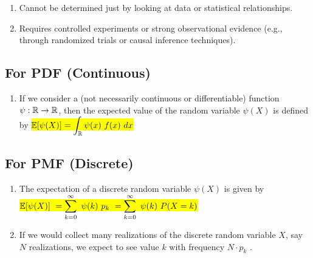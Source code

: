 \begin{enumerate}
\begin{enumerate}
        \item Cannot be determined just by looking at data or statistical relationships.
        \hfill \cite{common/online/chatgpt}

        \item Requires controlled experiments or strong observational evidence (e.g., through randomized trials or causal inference techniques).
        \hfill \cite{common/online/chatgpt}
    \end{enumerate}
\end{enumerate}




\subsection{For PDF (Continuous)}

\begin{enumerate}
    \item If we consider a (not necessarily continuous or differentiable) function $\psi : \mathbb{R} \to \mathbb{R}$, then the expected value of the random variable $\psi (X)$ is defined by
    \colorbox{yellow}{$
        \mathbb{E}[\psi(X)]
        = \displaystyle\int_{\mathbb{R}} \psi(x)\ f(x)\ dx
    $}
    \hfill \cite{statistics/book/Statistics-for-Data-Scientists/Maurits-Kaptein}
\end{enumerate}




\subsection{For PMF (Discrete)}

\begin{enumerate}
    \item The expectation of a discrete random variable $\psi(X)$ is given by
    \hfill \cite{statistics/book/Statistics-for-Data-Scientists/Maurits-Kaptein}
    \\[0.2cm]
    \colorbox{yellow}{$
        \mathbb{E}[\psi(X)] \
        = \displaystyle\sum^{\infty}_{k=0}\ \psi(k)\ p _k \
        = \displaystyle\sum^{\infty}_{k=0}\ \psi(k)\ P(X = k)
    $}
    \hfill \cite{statistics/book/Statistics-for-Data-Scientists/Maurits-Kaptein}

    \item If we would collect many realizations of the discrete random variable $X$, say $N$ realizations, we expect to see value $k$ with frequency $N \cdot p _k$ .
    \hfill \cite{statistics/book/Statistics-for-Data-Scientists/Maurits-Kaptein}
\end{enumerate}




